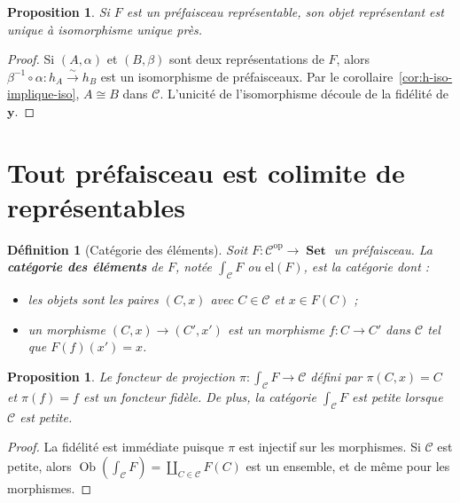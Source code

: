 \documentclass[a4paper,12pt]{book}
\DeclareMathOperator{\Ob}{Ob}
\DeclareMathOperator{\Set}{\mathbf{Set}}
\newcommand{\op}{\mathrm{op}}
\newtheorem{proposition}[theoreme]{Proposition}
\newtheorem{definition}[theoreme]{Définition}
\begin{document}
\begin{proposition}\label{prop:representant-unique}
Si $F$ est un préfaisceau représentable, son objet représentant
est unique à isomorphisme unique près.
\end{proposition}

\begin{proof}
Si $(A, \alpha)$ et $(B, \beta)$ sont deux représentations de $F$,
alors $\beta^{-1} \circ \alpha \colon h_A \xrightarrow{\sim} h_B$
est un isomorphisme de préfaisceaux. Par le
corollaire~\ref{cor:h-iso-implique-iso}, $A \cong B$ dans $\mathcal{C}$.
L'unicité de l'isomorphisme découle de la fidélité de $\mathbf{y}$.
\end{proof}


\section{Tout préfaisceau est colimite de représentables}%
\label{sec:prefaisceau-colimite}

\begin{definition}[Catégorie des éléments]\label{def:categorie-elements}
Soit $F \colon \mathcal{C}^{\op} \to \Set$ un préfaisceau.
La \textbf{catégorie des éléments} de $F$, notée
$\int_{\mathcal{C}} F$ ou $\mathrm{el}(F)$, est la catégorie dont :
\begin{itemize}
    \item les objets sont les paires $(C, x)$ avec $C \in \mathcal{C}$
    et $x \in F(C)$ ;
    \item un morphisme $(C, x) \to (C', x')$ est un morphisme
    $f \colon C \to C'$ dans $\mathcal{C}$ tel que $F(f)(x') = x$.
\end{itemize}
\end{definition}

\begin{proposition}\label{prop:el-projection}
Le foncteur de projection $\pi \colon \int_{\mathcal{C}} F \to \mathcal{C}$
défini par $\pi(C, x) = C$ et $\pi(f) = f$ est un foncteur fidèle.
De plus, la catégorie $\int_{\mathcal{C}} F$ est petite lorsque
$\mathcal{C}$ est petite.
\end{proposition}

\begin{proof}
La fidélité est immédiate puisque $\pi$ est injectif sur les morphismes.
Si $\mathcal{C}$ est petite, alors $\Ob(\int_{\mathcal{C}} F)
= \coprod_{C \in \mathcal{C}} F(C)$ est un ensemble, et de même pour
les morphismes.
\end{proof}
\end{document}
